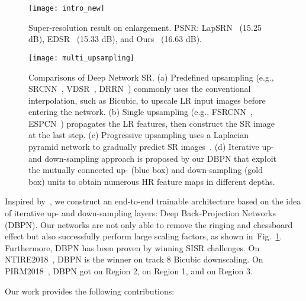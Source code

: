 \documentclass[10pt,journal,compsoc]{IEEEtran}
\begin{document}
\begin{figure}[t!]
\centering
\texttt{[image: intro\_new]}
\caption{Super-resolution result on  enlargement. PSNR: LapSRN~\cite{LapSRN} (15.25 dB), EDSR~\cite{Lim_2017_CVPR_Workshops} (15.33 dB), and Ours~\cite{haris2018deep} (16.63 dB).}
\label{figure:intro}
\end{figure}

\begin{figure*}[t!]
\centering
\texttt{[image: multi\_upsampling]}\vspace{-1em}
\caption{Comparisons of Deep Network SR. (a) Predefined upsampling (e.g., SRCNN~\cite{dong2016image}, VDSR~\cite{Kim_2016_VDSR}, DRRN~\cite{Tai-DRRN-2017}) commonly uses the conventional interpolation, such as Bicubic, to upscale LR input images before entering the network. (b) Single upsampling (e.g., FSRCNN~\cite{dong2016accelerating}, ESPCN~\cite{shi2016real}) propagates the LR features, then construct the SR image at the last step. (c) Progressive upsampling uses a Laplacian pyramid network to gradually predict SR images~\cite{LapSRN}. (d) Iterative up- and down-sampling approach is proposed by our DBPN that exploit the mutually connected up- (blue box) and down-sampling (gold box) units to obtain numerous HR feature maps in different depths.}
\label{figure:multi_upsampling}
\end{figure*}

Inspired by~\cite{irani93}, we construct an end-to-end
trainable architecture based on the idea of iterative up- and
down-sampling layers: Deep Back-Projection Networks (DBPN). Our networks are not only able to remove the ringing and chessboard effect but also successfully perform large scaling factors, as shown
in~Fig.~\ref{figure:intro}. 
Furthermore, DBPN has been proven by winning SISR challenges. On NTIRE2018~\cite{timofte2018ntire}, DBPN is the  winner on track 8 Bicubic downscaling. On PIRM2018~\cite{pirm2018}, DBPN got  on Region 2,  on Region 1, and  on Region 3.



Our work provides the following contributions:
\end{document}
